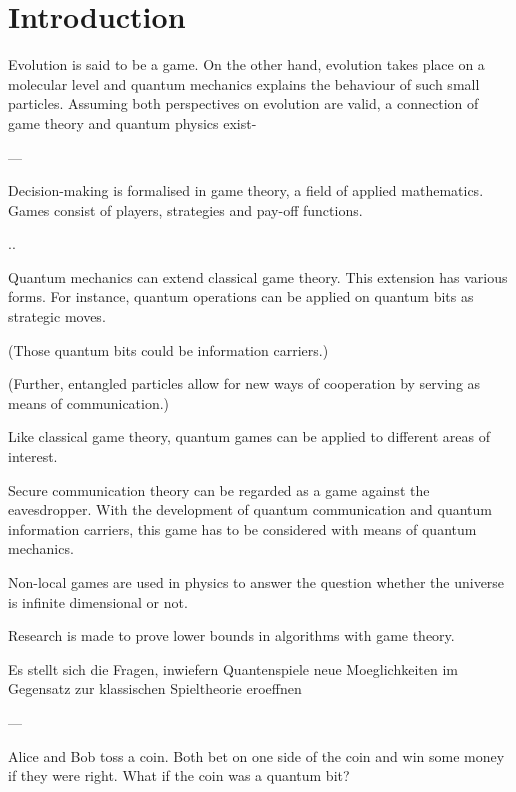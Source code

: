 \chapter{Introduction}
Evolution is said to be a game. On the other hand, evolution takes place on a molecular level and quantum mechanics explains the behaviour of such small particles. Assuming both perspectives on evolution are valid, a connection of game theory and quantum physics exist-

---

Decision-making is formalised in game theory, a field of applied mathematics. Games consist of players, strategies and pay-off functions. 

..

Quantum mechanics can extend classical game theory. This extension has various forms. For instance, quantum operations can be applied on quantum bits as strategic moves.

(Those quantum bits could be information carriers.)

(Further, entangled particles allow for new ways of cooperation by serving as means of communication.)

Like classical game theory, quantum games can be applied to different areas of interest. 

Secure communication theory can be regarded as a game against the eavesdropper. With the development of quantum communication and quantum information carriers, this game has to be considered with means of quantum mechanics.

Non-local games are used in physics to answer the question whether the universe is infinite dimensional or not.

Research is made to prove lower bounds in algorithms with game theory. 

Es stellt sich die Fragen, inwiefern Quantenspiele neue Moeglichkeiten im Gegensatz zur klassischen Spieltheorie eroeffnen


---

Alice and Bob toss a coin. Both bet on one side of the coin and win some money if they were right. What if the coin was a quantum bit?